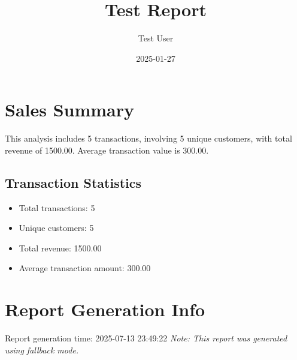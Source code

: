 \documentclass{article}
\title{Test Report}
\author{Test User}
\date{2025-01-27}
\begin{document}
\maketitle

\section{Sales Summary}
This analysis includes 5 transactions,
involving 5 unique customers,
with total revenue of 1500.00.
Average transaction value is 300.00.

\subsection{Transaction Statistics}
\begin{itemize}
\item Total transactions: 5
\item Unique customers: 5
\item Total revenue: 1500.00
\item Average transaction amount: 300.00
\end{itemize}

\section{Report Generation Info}
Report generation time: 2025-07-13 23:49:22
\textit{Note: This report was generated using fallback mode.}




\end{document}
